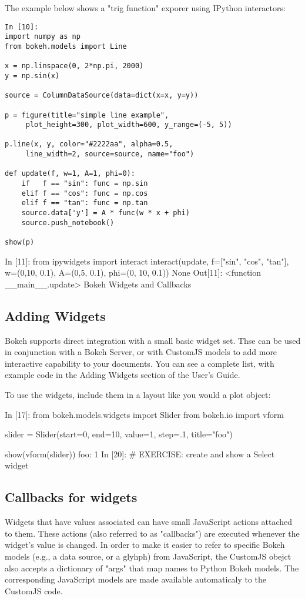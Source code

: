 \documentclass[a4paper,12pt]{article}
\begin{document}
The example below shows a "trig function" exporer using IPython interactors:

\begin{framed}
\begin{verbatim}
In [10]:
import numpy as np
from bokeh.models import Line

x = np.linspace(0, 2*np.pi, 2000)
y = np.sin(x)

source = ColumnDataSource(data=dict(x=x, y=y))

p = figure(title="simple line example", 
     plot_height=300, plot_width=600, y_range=(-5, 5))
     
p.line(x, y, color="#2222aa", alpha=0.5, 
     line_width=2, source=source, name="foo")

def update(f, w=1, A=1, phi=0):
    if   f == "sin": func = np.sin
    elif f == "cos": func = np.cos
    elif f == "tan": func = np.tan
    source.data['y'] = A * func(w * x + phi)
    source.push_notebook()

show(p)
\end{verbatim}
\end{framed}
In [11]:
from ipywidgets import interact
interact(update, f=["sin", "cos", "tan"], w=(0,10, 0.1), A=(0,5, 0.1), phi=(0, 10, 0.1))
None
Out[11]:
<function __main__.update>
Bokeh Widgets and Callbacks

\subsection{Adding Widgets}
Bokeh supports direct integration with a small basic widget set. Thse can be used in conjunction with a Bokeh Server, or with CustomJS models to add more interactive capability to your documents. You can see a complete list, with example code in the Adding Widgets section of the User's Guide.

To use the widgets, include them in a layout like you would a plot object:

In [17]:
from bokeh.models.widgets import Slider
from bokeh.io import vform

slider = Slider(start=0, end=10, value=1, step=.1, title="foo")

show(vform(slider))
foo:  
1
In [20]:
# EXERCISE: create and show a Select widget 

\subsection{Callbacks for widgets}
Widgets that have values associated can have small JavaScript actions attached to them. These actions (also referred to as "callbacks") are executed whenever the widget's value is changed. In order to make it easier to refer to specific Bokeh models (e.g., a data source, or a glyhph) from JavaScript, the CustomJS obejct also accepts a dictionary of "args" that map names to Python Bokeh models. The corresponding JavaScript models are made available automaticaly to the CustomJS code.
\end{document}
